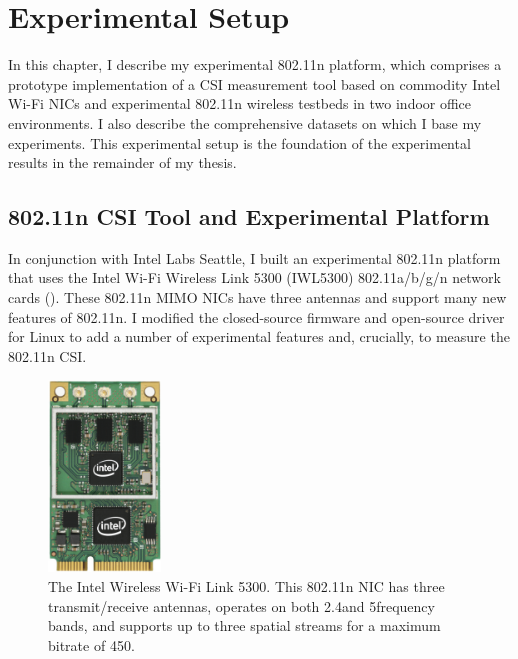 \ifx\mainfile\undefined

\setcounter{chapter}{4} %
\fi

\cleardoublepage
\chapter{Experimental Setup}
\label{chap:tool}

In this chapter, I describe my experimental 802.11n platform, which comprises a prototype implementation of a CSI measurement tool based on commodity Intel Wi-Fi NICs and experimental 802.11n wireless testbeds in two indoor office environments. I also describe the comprehensive datasets on which I base my experiments. This experimental setup is the foundation of the experimental results in the remainder of my thesis.

\section{802.11n CSI Tool and Experimental Platform}
\label{sec:platform}
In conjunction with Intel Labs Seattle, I built an experimental 802.11n platform that uses the Intel Wi-Fi Wireless Link 5300 (IWL5300) 802.11a/b/g/n network cards (). These 802.11n MIMO NICs have three antennas and support many new features of 802.11n. I modified the closed-source firmware and open-source  driver for Linux to add a number of experimental features and, crucially, to measure the 802.11n CSI.

\begin{figure}
	\centering
	\includegraphics[height=2in]{figures/iwlwifi-5300.png}
	\caption[The Intel Wireless Wi-Fi Link 5300]{\label{fig:iwl5300}The Intel Wireless Wi-Fi Link 5300. This 802.11n NIC has three transmit/receive antennas, operates on both 2.4\GHz and 5\GHz frequency bands, and supports up to three spatial streams for a maximum bitrate of 450\Mbps.}
\end{figure}

